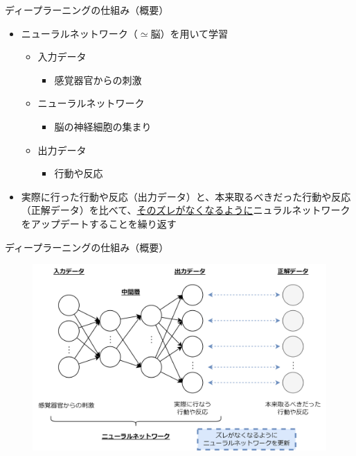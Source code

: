 \documentclass[dvipdfmx,aspectratio=169]{beamer}
\begin{document}
	\begin{frame}{ディープラーニングの仕組み（概要）}
		\begin{itemize}
			\item \alert{ニューラルネットワーク}（$ \simeq $脳）を用いて学習
			\begin{itemize}
				\item \alert{入力データ}
				\begin{itemize}
					\item 感覚器官からの刺激
				\end{itemize}
				\item \alert{ニューラルネットワーク}
				\begin{itemize}
					\item 脳の神経細胞の集まり
				\end{itemize}
				\item \alert{出力データ}
				\begin{itemize}
					\item 行動や反応
				\end{itemize}
			\end{itemize}
			\item
				実際に行った行動や反応（\alert{出力データ}）と、本来取るべきだった行動や反応（\alert{正解データ}）を比べて、\underline{そのズレがなくなるように}ニュラルネットワークをアップデートすることを繰り返す
		\end{itemize}
	\end{frame}

	\begin{frame}{ディープラーニングの仕組み（概要）}
		\begin{figure}
			\centering
			\includegraphics[width=0.8\linewidth]{img/how-deep-learning-works(overview)}
		\end{figure}
	\end{frame}
\end{document}
